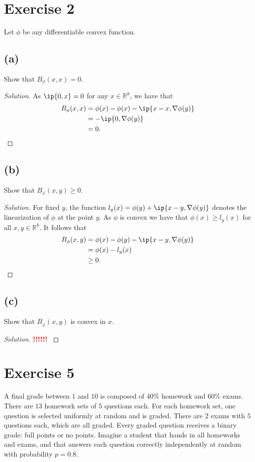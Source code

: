 \documentclass[10pt, a4paper, twoside]{amsart}
\newcommand{\R}{\ensuremath{\mathbb{R}}}
\DeclarePairedDelimiter{\ip}\langle\rangle
\newenvironment{solution}
               {\let\oldqedsymbol=\qedsymbol
                \renewcommand{\qedsymbol}{$\blacktriangleleft$}
                \begin{proof}[Solution]}
               {\end{proof}
                \renewcommand{\qedsymbol}{\oldqedsymbol}}
\newcommand{\TODO}{\textcolor{red}{\textbf{!!!!!! }}}
\begin{document}
\section*{Exercise 2}
Let $\phi$ be any differentiable convex function.
\subsection*{(a)}
Show that $B_{\phi}(x,x)=0$.
\begin{solution}
As $\ip{0,x}=0$ for any $x \in  \R^k$, we have that
\begin{align*}
  B_{\phi}(x,x)&=\phi(x)-\phi(x)-\ip{x-x,\nabla \phi(y)} \\
  &=-\ip{0,\nabla \phi(y)} \\
  &=0.
\end{align*}
\end{solution}

\subsection*{(b)}
Show that $B_{\varphi}(x,y)\geq 0$.
\begin{solution}
For fixed $y$, the function $l_y(x)=\phi(y)+\ip{x-y, \nabla \phi(y)}$ denotes the linearization of $\phi$ at the point $y$.
As $\phi$ is convex we have that $\phi(x)\geq l_y(x)$ for all $x,y \in \R^k$. 
It follows that 
\begin{align*}
 B_{\phi}(x,y)&=\phi(x)-\phi(y)-\ip{x-y, \nabla \phi(y)} \\
 &=\phi(x)-l_y(x) \\
 &\geq0.
\end{align*}
\end{solution}

\subsection*{(c)}
Show that $B_{\varphi}(x,y)$ is convex in $x$.
\begin{solution}
\TODO 
\end{solution}


\section*{Exercise 5}
A final grade between $1$ and $10$ is composed of $40\%$ homework
and $60\%$ exams. There are $13$ homework sets of $5$ questions each. For
each homework set, one question is selected uniformly at random and is
graded. There are $2$ exams with $5$ questions each, which are all graded.
Every graded question receives a binary grade: full points or no points.
Imagine a student that hands in all homeworks and exams, and that answers 
each question correctly independently at random with probability $p = 0.8$.
\end{document}

